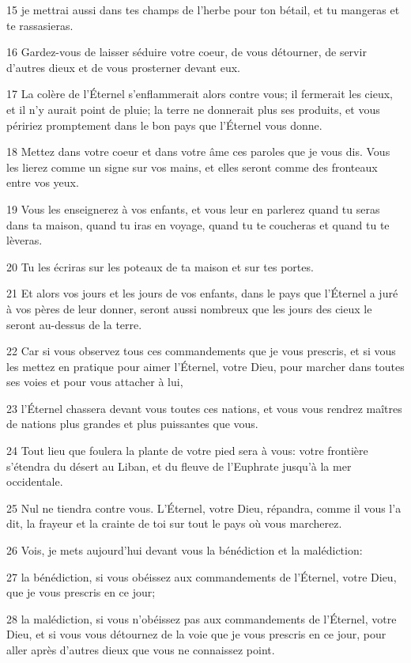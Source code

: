 \par 15 je mettrai aussi dans tes champs de l'herbe pour ton bétail, et tu mangeras et te rassasieras.
\par 16 Gardez-vous de laisser séduire votre coeur, de vous détourner, de servir d'autres dieux et de vous prosterner devant eux.
\par 17 La colère de l'Éternel s'enflammerait alors contre vous; il fermerait les cieux, et il n'y aurait point de pluie; la terre ne donnerait plus ses produits, et vous péririez promptement dans le bon pays que l'Éternel vous donne.
\par 18 Mettez dans votre coeur et dans votre âme ces paroles que je vous dis. Vous les lierez comme un signe sur vos mains, et elles seront comme des fronteaux entre vos yeux.
\par 19 Vous les enseignerez à vos enfants, et vous leur en parlerez quand tu seras dans ta maison, quand tu iras en voyage, quand tu te coucheras et quand tu te lèveras.
\par 20 Tu les écriras sur les poteaux de ta maison et sur tes portes.
\par 21 Et alors vos jours et les jours de vos enfants, dans le pays que l'Éternel a juré à vos pères de leur donner, seront aussi nombreux que les jours des cieux le seront au-dessus de la terre.
\par 22 Car si vous observez tous ces commandements que je vous prescris, et si vous les mettez en pratique pour aimer l'Éternel, votre Dieu, pour marcher dans toutes ses voies et pour vous attacher à lui,
\par 23 l'Éternel chassera devant vous toutes ces nations, et vous vous rendrez maîtres de nations plus grandes et plus puissantes que vous.
\par 24 Tout lieu que foulera la plante de votre pied sera à vous: votre frontière s'étendra du désert au Liban, et du fleuve de l'Euphrate jusqu'à la mer occidentale.
\par 25 Nul ne tiendra contre vous. L'Éternel, votre Dieu, répandra, comme il vous l'a dit, la frayeur et la crainte de toi sur tout le pays où vous marcherez.
\par 26 Vois, je mets aujourd'hui devant vous la bénédiction et la malédiction:
\par 27 la bénédiction, si vous obéissez aux commandements de l'Éternel, votre Dieu, que je vous prescris en ce jour;
\par 28 la malédiction, si vous n'obéissez pas aux commandements de l'Éternel, votre Dieu, et si vous vous détournez de la voie que je vous prescris en ce jour, pour aller après d'autres dieux que vous ne connaissez point.
